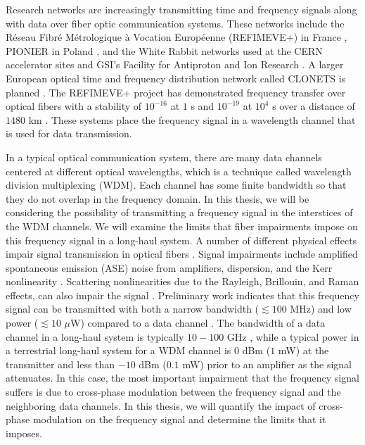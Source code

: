Research networks are increasingly transmitting time and frequency signals along with data over fiber optic communication systems. These networks include the R\'eseau Fibr\'e M\'etrologique \`a Vocation Europ\'eenne (REFIMEVE+) in France \cite{cantin2017progress}, PIONIER in Poland \cite{Turza2017}, 
and the White Rabbit networks used at the CERN accelerator sites and GSI's Facility for Antiproton and Ion Research \cite{Serrano2013}.  
A larger European optical time and frequency distribution network called CLONETS is planned \cite{CLONETS}.
The REFIMEVE+ project has demonstrated frequency transfer over optical fibers with a stability of $10^{-16}$ at $1$ s and $10^{-19}$ at $10^4$ s over a distance of $1480$ km \cite{cantin2017progress}. These systems place the frequency signal in a wavelength channel that is used for data transmission.

In a typical optical communication system, there are many data channels centered at different optical wavelengths, which is a technique called wavelength division multiplexing (WDM).  Each channel has some finite bandwidth so that they do not overlap in the frequency domain.  In this thesis, we will be considering the possibility of transmitting a frequency signal in the interstices of the WDM channels. We will examine the limits that fiber impairments impose on this frequency signal in a long-haul system.  A number of different physical effects impair signal transmission in optical fibers \cite{agrawal2012fiber}. Signal impairments include amplified spontaneous emission (ASE) noise from amplifiers, dispersion, and the Kerr nonlinearity \cite{agrawal2012fiber}.  Scattering nonlinearities due to the Rayleigh, Brillouin, and Raman effects, can also impair the signal \cite{agrawal2012fiber,Agrawal2013}.  Preliminary work indicates that this frequency signal can be transmitted with both a narrow bandwidth ($\lesssim 100$ MHz) and low power ($\lesssim 10$ $\mu$W) compared to a data channel \cite{menyukIFCS2015}.  The bandwidth of a data channel in a long-haul system is typically $10-100$ GHz \cite{ITU-T2012}, while a typical power in a terrestrial long-haul system for a WDM channel is $0$ dBm ($1$ mW) at the transmitter and less than $-10$ dBm ($0.1$ mW) prior to an amplifier as the signal attenuates.  In this case, the most important impairment that the frequency signal suffers is due to cross-phase modulation between the frequency signal and the neighboring data channels.  In this thesis, we will quantify the impact of cross-phase modulation on the frequency signal and determine the limits that it imposes.


